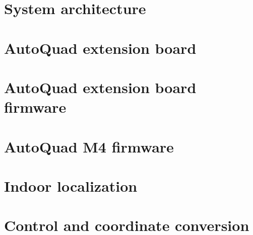 
\section{System architecture}


\section{AutoQuad extension board} \label{sec:autoquad_extension_board}


\section{AutoQuad extension board firmware} \label{sec:extension_board_firmware}


\section{AutoQuad M4 firmware} \label{sec:aq_m4_firmware}


%

%






\section{Indoor localization} \label{sec:indoor_localization}


\section{Control and coordinate conversion}
\label{sec:control_and_coordinate_conversion}


